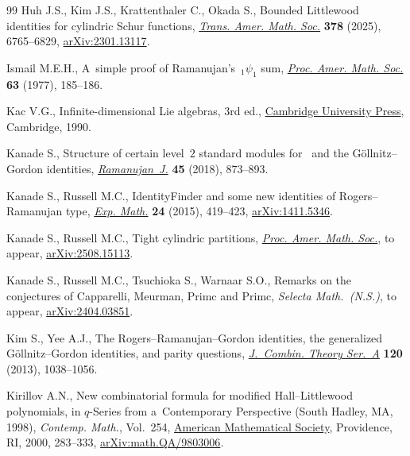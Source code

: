 \documentclass[pdftex]{sigma}
\numberwithin{equation}{section}
\begin{document}
\begin{thebibliography}{99}
Huh J.S., Kim J.S., Krattenthaler C., Okada S., Bounded {L}ittlewood identities
 for cylindric {S}chur functions,
 \href{https://doi.org/10.1090/tran/9500}{\textit{Trans. Amer. Math. Soc.}}
 \textbf{378} (2025), 6765--6829,
 \href{http://arxiv.org/abs/2301.13117}{arXiv:2301.13117}.

Ismail M.E.H., A~simple proof of {R}amanujan's~{$_{1}\psi _{1}$} sum,
 \href{https://doi.org/10.2307/2041093}{\textit{Proc. Amer. Math. Soc.}}
 \textbf{63} (1977), 185--186.

Kac V.G., Infinite-dimensional {L}ie algebras, 3rd ed.,
 \href{https://doi.org/10.1017/CBO9780511626234}{Cambridge University Press},
 Cambridge, 1990.

Kanade S., Structure of certain level~$2$ standard modules for~
 and the {G}\"ollnitz--{G}ordon identities,
 \href{https://doi.org/10.1007/s11139-016-9875-0}{\textit{Ramanujan~J.}}
 \textbf{45} (2018), 873--893.

Kanade S., Russell M.C., {I}dentity{F}inder and some new identities of
 {R}ogers--{R}amanujan type,
 \href{https://doi.org/10.1080/10586458.2015.1015186}{\textit{Exp. Math.}}
 \textbf{24} (2015), 419--423,
 \href{http://arxiv.org/abs/1411.5346}{arXiv:1411.5346}.

Kanade S., Russell M.C., Tight cylindric partitions,
 \href{https://doi.org/10.1090/proc/17685}{\textit{Proc. Amer. Math. Soc.}}, {t}o appear,
 \href{http://arxiv.org/abs/2508.15113}{arXiv:2508.15113}.

Kanade S., Russell M.C., Tsuchioka S., Warnaar S.O., Remarks on the conjectures
 of {C}apparelli, {M}eurman, {P}rimc and {P}rimc, \textit{Selecta Math.~(N.S.)}, to appear,
 \href{http://arxiv.org/abs/2404.03851}{arXiv:2404.03851}.

Kim S., Yee A.J., The {R}ogers--{R}amanujan--{G}ordon identities, the
 generalized {G}\"ollnitz--{G}ordon identities, and parity questions,
 \href{https://doi.org/10.1016/j.jcta.2013.02.005}{\textit{J.~Combin. Theory
 Ser.~A}} \textbf{120} (2013), 1038--1056.

Kirillov A.N., New combinatorial formula for modified {H}all--{L}ittlewood
 polynomials, in {$q$}-{S}eries from a~{C}ontemporary {P}erspective ({S}outh
 {H}adley, {MA}, 1998), \textit{Contemp. Math.}, Vol.~254,
 \href{https://doi.org/10.1090/conm/254/03959}{American Mathematical Society},
 Providence, RI, 2000, 283--333,
 \href{http://arxiv.org/abs/math.QA/9803006}{arXiv:math.QA/9803006}.


\end{thebibliography}
\end{document}
